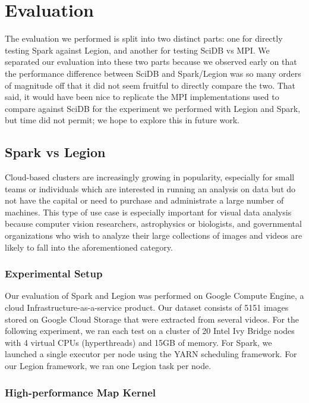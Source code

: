 \documentclass[tog]{acmsiggraph}
\begin{document}
\section{Evaluation}

The evaluation we performed is split into two distinct parts: one for directly
testing Spark against Legion, and another for testing SciDB vs MPI. We
separated our evaluation into these two parts because we observed early on that
the performance difference between SciDB and Spark/Legion was so many orders of
magnitude off that it did not seem fruitful to directly compare the two. That
said, it would have been nice to replicate the MPI implementations used to
compare against SciDB for the experiment we performed with Legion and Spark,
but time did not permit; we hope to explore this in future work.

\subsection{Spark vs Legion}

Cloud-based clusters are increasingly growing in popularity, especially for
small teams or individuals which are interested in running an analysis on data
but do not have the capital or need to purchase and administrate a large number
of machines. This type of use case is especially important for visual data
analysis because computer vision researchers, astrophysics or biologists, and
governmental organizations who wish to analyze their large collections of
images and videos are likely to fall into the aforementioned category.

\subsubsection{Experimental Setup}

Our evaluation of Spark and Legion was performed on Google Compute Engine, a
cloud Infrastructure-as-a-service product. Our dataset consists of 5151 images
stored on Google Cloud Storage that were extracted from several videos. For the
following experiment, we ran each test on a cluster of 20 Intel Ivy Bridge
nodes with 4 virtual CPUs (hyperthreads) and 15GB of memory. For Spark, we
launched a single executor per node using the YARN scheduling framework. For
our Legion framework, we ran one Legion task per node.

\subsubsection{High-performance Map Kernel}
\end{document}
